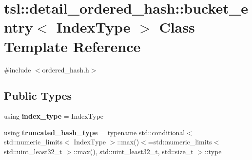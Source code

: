 \hypertarget{classtsl_1_1detail__ordered__hash_1_1bucket__entry}{}\section{tsl\+::detail\+\_\+ordered\+\_\+hash\+::bucket\+\_\+entry$<$ Index\+Type $>$ Class Template Reference}
\label{classtsl_1_1detail__ordered__hash_1_1bucket__entry}


{\ttfamily \#include $<$ordered\+\_\+hash.\+h$>$}

\subsection*{Public Types}
\begin{DoxyCompactItemize}
\item 
\mbox{\label{classtsl_1_1detail__ordered__hash_1_1bucket__entry_ab8e3cb37e3bfd0a27f95de35b030cee1}} 
using {\bfseries index\+\_\+type} = Index\+Type
\item 
\mbox{\label{classtsl_1_1detail__ordered__hash_1_1bucket__entry_a5ba01b224f4307dd9166dd33271a2ed4}} 
using {\bfseries truncated\+\_\+hash\+\_\+type} = typename std\+::conditional$<$ std\+::numeric\+\_\+limits$<$ Index\+Type $>$\+::max()$<$=std\+::numeric\+\_\+limits$<$ std\+::uint\+\_\+least32\+\_\+t $>$\+::max(), std\+::uint\+\_\+least32\+\_\+t, std\+::size\+\_\+t $>$\+::type
\end{DoxyCompactItemize}
